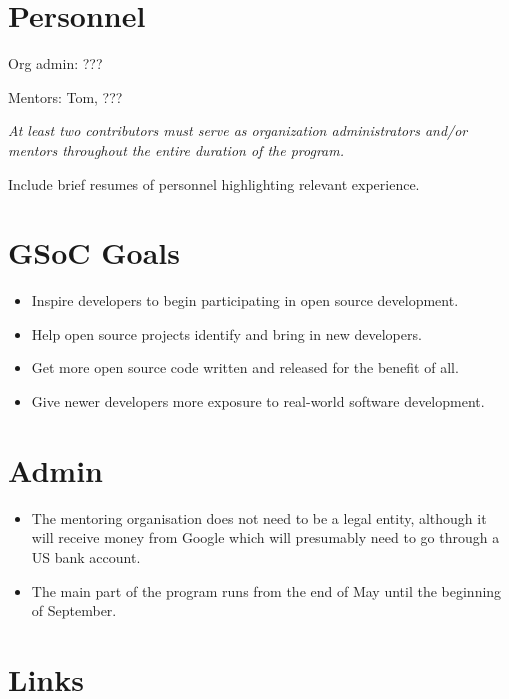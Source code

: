 \documentclass{article}
\begin{document}
\section{Personnel}

\begin{flushleft}
Org admin: ???

Mentors: Tom, ???
\end{flushleft}

{\itshape 
At least two contributors must serve as organization administrators and/or mentors throughout the entire duration of the program.

Include brief resumes of personnel highlighting relevant experience.
}


\section{GSoC Goals}

{\itshape
\begin{itemize}
\item Inspire developers to begin participating in open source development.
\item Help open source projects identify and bring in new developers.
\item Get more open source code written and released for the benefit of all.
\item Give newer developers more exposure to real-world software development.
\end{itemize}
}


\section{Admin}

{\itshape 
\begin{itemize}
\item The mentoring organisation does not need to be a legal entity, although it will receive money from Google which will presumably need to go through a US bank account.
\item The main part of the program runs from the end of May until the beginning of September.
\end{itemize}
}

\section{Links}
\end{document}
